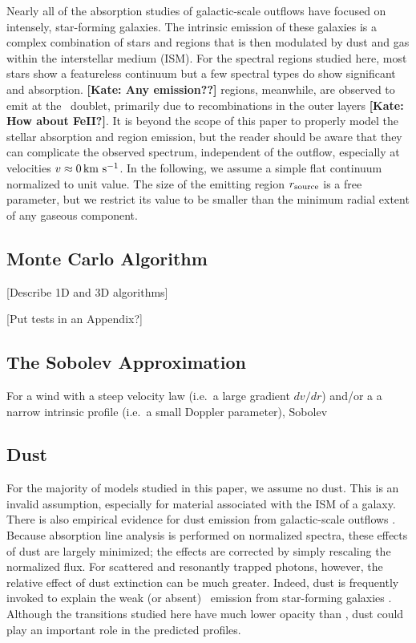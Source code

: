 \documentclass[12pt,preprint]{aastex}
\begin{document}
Nearly all of the absorption studies of galactic-scale outflows 
have focused on intensely, star-forming galaxies.  The
intrinsic emission of these galaxies is a complex combination of
stars and  regions that is then modulated by dust and gas
within the interstellar medium (ISM).  For the spectral regions studied
here, most stars show a featureless continuum but a few spectral
types do show significant  and  absorption.
{\bf [Kate: Any emission??]}   regions, meanwhile, are observed to emit
at the \mgiid\ doublet, primarily due to recombinations in the outer
layers {\bf [Kate: How about FeII?]}.  It is beyond the scope of this paper to
properly model the 
stellar absorption and  region emission, but the reader
should be aware that they can complicate the observed spectrum,
independent of the outflow, especially at velocities $v \approx 0 \, {\rm km~s^{-1}}$.
In the following, we assume a simple flat continuum 
normalized to unit value.  The size of the emitting
region $r_{\rm source}$ is a free parameter, but we restrict its value
to be smaller than the minimum radial extent of any gaseous
component. 


\subsection{Monte Carlo Algorithm}

[Describe 1D and 3D algorithms]

[Put tests in an Appendix?]

\subsection{The Sobolev Approximation}

For a wind with a steep velocity law (i.e.\ a large gradient $dv/dr$)
and/or a a narrow intrinsic profile (i.e.\ a small Doppler parameter),
Sobolev \cite{sobolev} 

\subsection{Dust}
\label{sec:dust_method}

For the majority of models studied in this paper, we assume no dust.
This is an invalid assumption, especially for material associated with
the ISM of a galaxy.  
There is also empirical evidence for dust emission from galactic-scale
outflows \citep[e.g.][]{M87_dust}.
Because absorption line analysis is performed
on normalized spectra, these effects of dust are largely minimized; 
the effects are corrected by simply rescaling the normalized flux.  For
scattered and resonantly trapped photons, however, the relative effect of dust
extinction can be much greater.  Indeed, dust is frequently invoked to
explain the weak (or absent) \lya\ emission from star-forming galaxies
\citep[e.g.][]{shapley03}.  Although the transitions studied here have
much lower opacity than \lya, dust could play an important role
in the predicted profiles.
\end{document}
